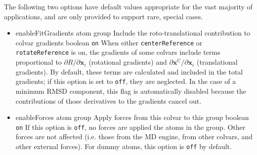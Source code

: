 The following two options have default values appropriate for the vast majority of applications, and are only provided to support rare, special cases.
\begin{itemize}

\item %
  \keydef
    {enableFitGradients}{%
    atom group}{%
    Include the roto-translational contribution to colvar gradients}{%
    boolean}{%
    \texttt{on}}{%
    When either \texttt{centerReference} or \texttt{rotateReference} is on,
    the gradients of some colvars include terms proportional to
    $\partial{}R/\partial\mathbf{x}_{i}$ (rotational gradients) and
    $\partial\mathbf{x}^{\mathrm{C}}/\partial\mathbf{x}_{i}$ (translational gradients).
    By default, these terms are calculated and included in the total gradients;
    if this option is set to \texttt{off}, they are neglected.
    In the case of a minimum RMSD component, this flag is automatically disabled
    because the contributions of those derivatives to the gradients cancel out.
}

\item %
  \keydef
    {enableForces}{%
    atom group}{%
    Apply forces from this colvar to this group}{%
    boolean}{%
    \texttt{on}}{%
    If this option is \texttt{off}, no forces are applied the atoms in the group.
    Other forces are not affected (i.e. those
    from the MD engine, from other colvars, and other external forces).
    For dummy atoms, this option is \texttt{off} by default.
 }

\end{itemize}




